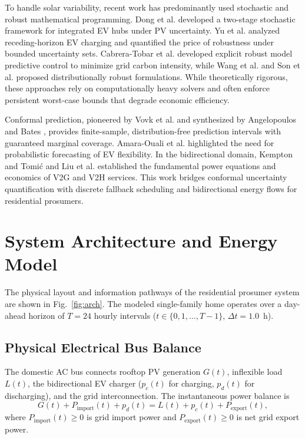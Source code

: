 \documentclass[conference]{IEEEtran}
\begin{document}
To handle solar variability, recent work has predominantly used stochastic and robust mathematical programming. Dong et al. \cite{dong2025stochastic} developed a two-stage stochastic framework for integrated EV hubs under PV uncertainty. Yu et al. \cite{yu2024impact} analyzed receding-horizon EV charging and quantified the price of robustness under bounded uncertainty sets. Cabrera-Tobar et al. \cite{cabreratobar2024demand} developed explicit robust model predictive control to minimize grid carbon intensity, while Wang et al. \cite{wang2025datadriven} and Son et al. \cite{son2026weather} proposed distributionally robust formulations. While theoretically rigorous, these approaches rely on computationally heavy solvers and often enforce persistent worst-case bounds that degrade economic efficiency.

Conformal prediction, pioneered by Vovk et al. \cite{vovk2005algorithmic} and synthesized by Angelopoulos and Bates \cite{angelopoulos2021gentle}, provides finite-sample, distribution-free prediction intervals with guaranteed marginal coverage. Amara-Ouali et al. \cite{amaraouali2023quantifying} highlighted the need for probabilistic forecasting of EV flexibility. In the bidirectional domain, Kempton and Tomi{\'c} \cite{kempton2005v2g} and Liu et al. \cite{liu2013v2g_v2h} established the fundamental power equations and economics of V2G and V2H services. This work bridges conformal uncertainty quantification with discrete fallback scheduling and bidirectional energy flows for residential prosumers.

\section{System Architecture and Energy Model}
The physical layout and information pathways of the residential prosumer system are shown in Fig.~\ref{fig:arch}. The modeled single-family home operates over a day-ahead horizon of $T=24$ hourly intervals ($t \in \{0, 1, \dots, T-1\}$, $\Delta t = 1.0$~h).

\subsection{Physical Electrical Bus Balance}
The domestic AC bus connects rooftop PV generation $G(t)$, inflexible load $L(t)$, the bidirectional EV charger ($p_c(t)$ for charging, $p_d(t)$ for discharging), and the grid interconnection. The instantaneous power balance is
\begin{equation}
G(t) + P_{\text{import}}(t) + p_d(t) = L(t) + p_c(t) + P_{\text{export}}(t),
\end{equation}
where $P_{\text{import}}(t) \ge 0$ is grid import power and $P_{\text{export}}(t) \ge 0$ is net grid export power.
\end{document}
